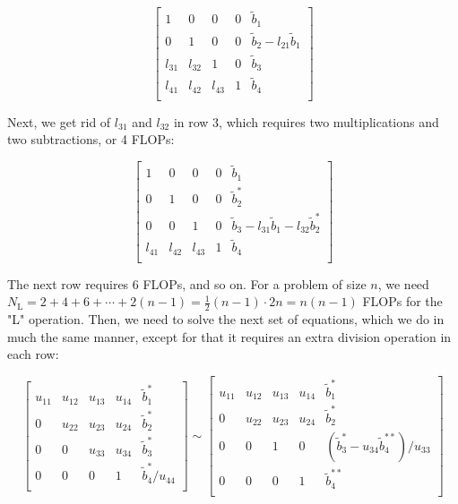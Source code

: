 \documentclass[]{article}
\begin{document}
\begin{equation*}
\left[ \begin{array}{cccc|c}
	     1 &      0 &      0 & 0 & \tilde{b}_1  \\
	     0 &      1 &      0 & 0 & \tilde{b}_2 - l_{21}\tilde{b}_1   \\
	l_{31} & l_{32} &      1 & 0 & \tilde{b}_3  \\
	l_{41} & l_{42} & l_{43} & 1 & \tilde{b}_4    \\
\end{array} \right]
\end{equation*}

Next, we get rid of $l_{31}$ and $l_{32}$ in row 3, which requires two  multiplications and two subtractions, or 4 FLOPs:

\begin{equation*}
\left[ \begin{array}{cccc|c}
1 &      0 &      0 & 0 & \tilde{b}_1  \\
0 &      1 &      0 & 0 & \tilde{b}_{2}^{\ast}   \\
0 &      0 &      1 & 0 & \tilde{b}_3 - l_{31}\tilde{b}_{1}- l_{32}\tilde{b}_{2}^{\ast}   \\
l_{41} & l_{42} & l_{43} & 1 & \tilde{b}_4    \\
\end{array} \right]
\end{equation*}

The next row requires 6 FLOPs, and so on. For a problem of size $n$, we need $N_{\text{L}} = 2+4+6+\cdots+2(n-1) = \frac{1}{2}(n-1) \cdot 2n = n(n-1)$ FLOPs for the "L" operation. Then, we need to solve the next set of equations, which we do in much the same manner, except for that it requires an extra division operation in each row: 

\begin{equation*}
\left[ \begin{array}{cccc|c}
u_{11} & u_{12} & u_{13} & u_{14} & \tilde{b}_1^{\ast} \\
0 & u_{22} & u_{23} & u_{24} & \tilde{b}_2^{\ast} \\
0 & 0 & u_{33} & u_{34} & \tilde{b}_3^{\ast} \\
0 & 0 & 0 & 1 & \tilde{b}_4^{\ast}/u_{44} \\
\end{array} \right]
\sim
\left[ \begin{array}{cccc|c}
u_{11} & u_{12} & u_{13} & u_{14} & \tilde{b}_1^{\ast} \\
0 & u_{22} & u_{23} & u_{24} & \tilde{b}_2^{\ast} \\
0 & 0 & 1 & 0 & (\tilde{b}_3^{\ast} - u_{34}\tilde{b}_4^{\ast\ast})/u_{33} \\
0 & 0 & 0 & 1 & \tilde{b}_4^{\ast\ast} \\
\end{array} \right]
\end{equation*}
\end{document}
